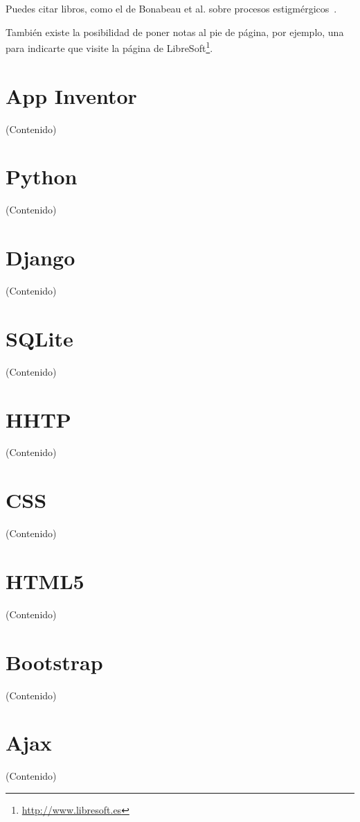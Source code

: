 \documentclass[a4paper, 12pt]{book}
\begin{document}
Puedes citar libros, como el de Bonabeau et al. sobre procesos estigmérgicos~\cite{bonabeau:_swarm}. %

También existe la posibilidad de poner notas al pie de página, por ejemplo, 
una para indicarte que visite la página de 
LibreSoft\footnote{\url{http://www.libresoft.es}}.

\section{App Inventor} 
\label{sec:seccion1}
(Contenido)

\section{Python} 
\label{sec:seccion2}
(Contenido)

\section{Django} 
\label{sec:seccion3}
(Contenido)

\section{SQLite} 
\label{sec:seccion4}
(Contenido)

\section{HHTP} 
\label{sec:seccion5}
(Contenido)

\section{CSS} 
\label{sec:seccion6}
(Contenido)

\section{HTML5} 
\label{sec:seccion7}
(Contenido)

\section{Bootstrap} 
\label{sec:seccion8}
(Contenido)

\section{Ajax} 
\label{sec:seccion9}
(Contenido)
\end{document}
